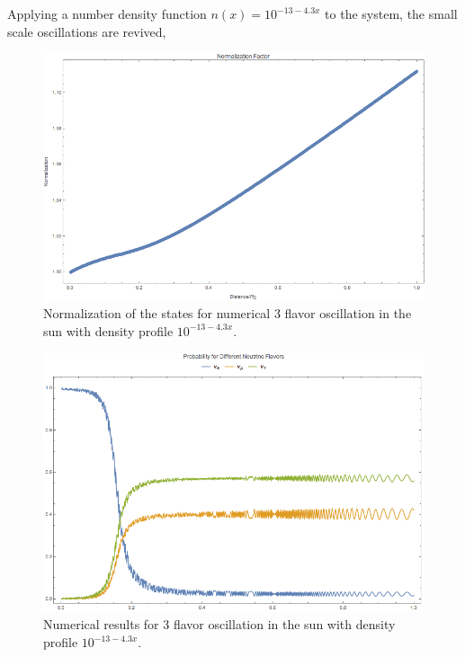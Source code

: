 \documentclass[letterpaper,12pt,english]{sphinxmanual}
\begin{document}
Applying a number density function \(n(x) = 10^{-13 - 4.3 x}\) to the system, the small scale oscillations are revived,
\begin{figure}[htbp]
\centering
\capstart

\includegraphics{numericalMSW3Flavor-2-norm.png}
\caption{Normalization of the states for numerical 3 flavor oscillation in the sun with density profile \(10^{-13 - 4.3 x}\).}\end{figure}
\begin{figure}[htbp]
\centering
\capstart

\includegraphics{numericalMSW3Flavor-2-probability.png}
\caption{Numerical results for 3 flavor oscillation in the sun with density profile \(10^{-13 - 4.3 x}\).}\end{figure}
\end{document}
